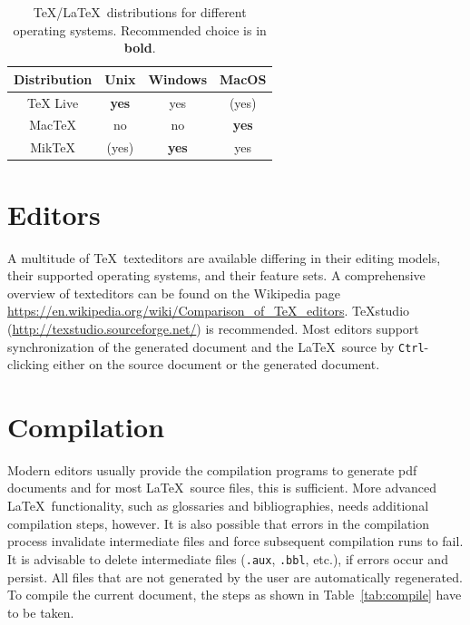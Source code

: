 \begin{table}
  \centering
  \begin{tabular}{cccc}
    \toprule
    Distribution & Unix         & Windows      & MacOS        \\
    \midrule
    TeX Live     & \textbf{yes} & yes          & (yes)        \\
    MacTeX       & no           & no           & \textbf{yes} \\
    MikTeX       & (yes)        & \textbf{yes} & yes          \\
    \bottomrule
  \end{tabular}
  \caption{\TeX/\LaTeX\ distributions for different operating systems. Recommended choice is in \textbf{bold}.}
  \label{tab:distrib} %
\end{table}

\section{Editors}

A multitude of \TeX\ \glspl{texteditor} are available differing in their editing models, their supported operating systems, and their feature sets.
A comprehensive overview of \glspl{texteditor} can be found on the Wikipedia page \url{https://en.wikipedia.org/wiki/Comparison_of_TeX_editors}.
TeXstudio (\url{http://texstudio.sourceforge.net/}) is recommended.
Most editors support synchronization of the generated document and the \LaTeX\ source by \verb|Ctrl|-clicking either on the source document or the generated document.

\section{Compilation}

Modern editors usually provide the compilation programs to generate \gls{pdf} documents and for most \LaTeX\ source files, this is sufficient.
More advanced \LaTeX\ functionality, such as glossaries and bibliographies, needs additional compilation steps, however.
It is also possible that errors in the compilation process invalidate intermediate files and force subsequent compilation runs to fail.
It is advisable to delete intermediate files (\verb|.aux|, \verb|.bbl|, etc.), if errors occur and persist.
All files that are not generated by the user are automatically regenerated.
To compile the current document, the steps as shown in Table~\ref{tab:compile} have to be taken.


